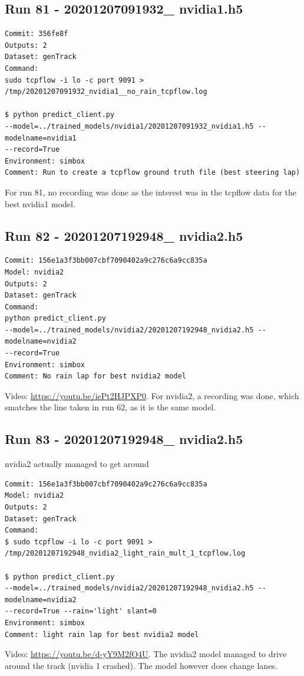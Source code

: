 \subsection{Run 81 - 20201207091932\_ nvidia1.h5}
\label{app_res:81}
\begin{verbatim}
Commit: 356fe8f 
Outputs: 2
Dataset: genTrack
Command:
sudo tcpflow -i lo -c port 9091 > /tmp/20201207091932_nvidia1__no_rain_tcpflow.log

$ python predict_client.py
--model=../trained_models/nvidia1/20201207091932_nvidia1.h5 --modelname=nvidia1 
--record=True
Environment: simbox
Comment: Run to create a tcpflow ground truth file (best steering lap)
\end{verbatim}
For run 81, no recording was done as the interest was in the tcpflow data for the best nvidia1 model.
\subsection{Run 82 - 20201207192948\_ nvidia2.h5 }
\label{app_res:82}
\begin{verbatim}
Commit: 156e1a3f3bb007cbf7090402a9c276c6a9cc835a
Model: nvidia2 
Outputs: 2
Dataset: genTrack
Command:
python predict_client.py
--model=../trained_models/nvidia2/20201207192948_nvidia2.h5 --modelname=nvidia2 
--record=True
Environment: simbox
Comment: No rain lap for best nvidia2 model

\end{verbatim}
Video: \url{https://youtu.be/iePt2HJPXP0}. 
For nvidia2, a recording was done, which smatches the line taken in run 62, as it is the same model.

\subsection{Run 83 - 20201207192948\_ nvidia2.h5 }
nvidia2 actually managed to get around
\label{app_res:83}
\begin{verbatim}
Commit: 156e1a3f3bb007cbf7090402a9c276c6a9cc835a
Model: nvidia2 
Outputs: 2
Dataset: genTrack
Command:
$ sudo tcpflow -i lo -c port 9091 > 
/tmp/20201207192948_nvidia2_light_rain_mult_1_tcpflow.log

$ python predict_client.py
--model=../trained_models/nvidia2/20201207192948_nvidia2.h5 --modelname=nvidia2 
--record=True --rain='light' slant=0
Environment: simbox
Comment: light rain lap for best nvidia2 model
\end{verbatim}
Video: \url{https://youtu.be/d-yY9M2fO4U}. The nvidia2 model managed to drive around the track (nvidia 1 crashed). The model however does change lanes.

